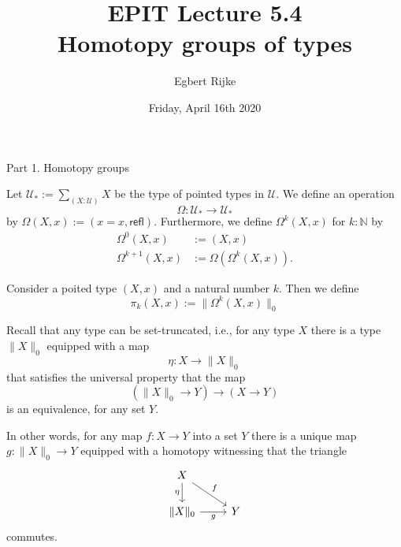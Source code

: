 \documentclass[handout]{beamer}
\title{EPIT Lecture 5.4\\ Homotopy groups of types}
\author{Egbert Rijke}
\date{Friday, April 16th 2020}
\newcommand{\N}{\mathbb{N}}
\newcommand{\UU}{\mathcal{U}}
\newcommand{\trunc}[2]{\|#2\|_{#1}}
\newcommand{\refl}{\mathsf{refl}}
\begin{document}
\begin{frame}
  \maketitle
\end{frame}

\begin{frame}
  \huge{Part 1. Homotopy groups}
\end{frame}

\begin{frame}
  \begin{definition}
    Let $\UU_\ast:=\sum_{(X:\UU)}X$ be the type of pointed types in $\UU$. We define an operation
    \begin{equation*}
      \Omega : \UU_\ast\to\UU_\ast
    \end{equation*}
    by $\Omega(X,x):=(x=x,\refl)$. Furthermore, we define $\Omega^k(X,x)$ for $k:\N$ by
    \begin{align*}
      \Omega^0(X,x) & :=(X,x) \\
      \Omega^{k+1}(X,x) & := \Omega(\Omega^k(X,x)).
    \end{align*}
  \end{definition}
  
  \begin{definition}
    Consider a poited type $(X,x)$ and a natural number $k$. Then we define
    \begin{equation*}
      \pi_k(X,x):=\trunc{0}{\Omega^k(X,x)}
    \end{equation*}
  \end{definition}
\end{frame}

\begin{frame}
  Recall that any type can be set-truncated, i.e., for any type $X$ there is a type $\trunc{0}{X}$ equipped with a map
  \begin{equation*}
    \eta : X \to \trunc{0}{X}
  \end{equation*}
  that satisfies the universal property that the map
  \begin{equation*}
    (\trunc{0}{X}\to Y)\to (X\to Y)
  \end{equation*}
  is an equivalence, for any set $Y$.\\[\baselineskip]\pause

  In other words, for any map $f:X\to Y$ into a set $Y$ there is a unique map $g:\trunc{0}{X}\to Y$ equipped with a homotopy witnessing that the triangle
  \begin{equation*}
    \begin{tikzcd}[ampersand replacement=\&]
      X \arrow[d,swap,"\eta"] \arrow[dr,"f"] \\
      \trunc{0}{X} \arrow[r,swap,"g"] \& Y
    \end{tikzcd}
  \end{equation*}
  commutes.
\end{frame}
\end{document}
